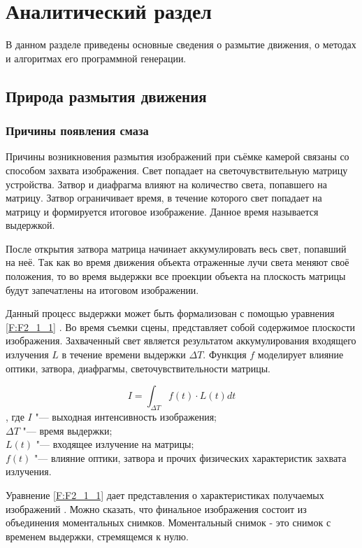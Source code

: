 \chapter{Аналитический раздел}
\label{cha:analysis}
В данном разделе приведены основные сведения о размытие движения, о методах и алгоритмах его программной генерации.

\section{Природа размытия движения}

\subsection{Причины появления смаза}

Причины возникновения размытия изображений при съёмке камерой связаны со способом захвата изображения. Свет попадает на светочувствительную матрицу устройства. Затвор и диафрагма влияют на количество света, попавшего на матрицу. Затвор ограничивает время, в течение которого свет попадает на матрицу и формируется итоговое изображение. Данное время называется выдержкой.
\par
После открытия затвора матрица начинает аккумулировать весь свет, попавший на неё. Так как во время движения объекта отраженные лучи света меняют своё положения, то во время выдержки все проекции объекта на плоскость матрицы будут запечатлены на итоговом изображении.
\par
Данный процесс выдержки может быть формализован с помощью уравнения \eqref{F:F2_1_1} . Во время съемки сцены,  представляет собой содержимое плоскости изображения. Захваченный свет является результатом аккумулирования входящего излучения $L$ в течение времени выдержки $\Delta T$. Функция $f$ моделирует влияние оптики, затвора, диафрагмы, светочувствительности матрицы.
\par
\begin{eqndesc}
    \begin{equation}
        I = \int_{\Delta T} f(t) \cdot L(t) dt
        \label{F:F2_1_1}
    \end{equation}
    , где 
    $I$ "--- выходная интенсивность изображения;\\        
    $\Delta T$ "--- время выдержки;\\        
    $L(t)$ "--- входящее излучение на матрицы;\\        
    $f(t)$ "--- влияние оптики, затвора и прочих физических характеристик захвата излучения.        
\end{eqndesc}
\par
Уравнение \eqref{F:F2_1_1} дает представления о характеристиках получаемых изображений  \cite{Navarro11}. Можно сказать, что финальное изображения состоит из объединения моментальных снимков. Моментальный снимок - это снимок с временем выдержки, стремящемся к нулю.

